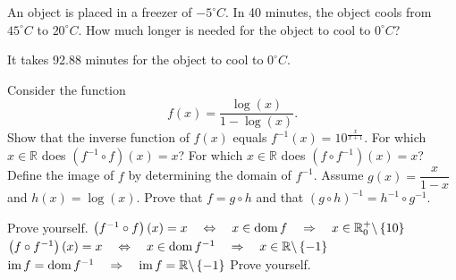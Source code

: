 \begin{Exercise}[difficulty=2] An object is placed in a freezer of $-5^{\circ} C$. In 40 minutes, the object cools from $45^{\circ} C$ to $20^{\circ} C$. How much longer is needed for the object to cool to $0^{\circ} C$?

\end{Exercise}

\begin{Answer}\phantom{}
    It takes 92.88 minutes for the object to cool to $0^{\circ} C$.
\end{Answer}

\ifanalysis
\begin{Exercise}[difficulty=1] Consider the function 
\[ f(x) = \dfrac{\log (x)}{1- \log (x)}. \]
    \Question Show that the inverse function of $f(x)$ equals $f^{-1}(x) = 10^{\frac{x}{x+1}}$.
    \Question For which  $x\in\mathbb{R}$ does $\left(f^{-1} \circ f \right) (x) = x$? For which $x\in\mathbb{R}$ does $\left(f \circ f^{-1}  \right) (x) = x$? 
    \Question Define the image of $f$ by determining the domain of $f^{-1}$.
    \Question Assume $g(x)=\dfrac{x}{1-x}$ and $h(x)=\log (x)$. Prove that $f=g \circ h$ and that $\left( g \circ h \right)^{-1} =h^{-1} \circ g^{-1}$. 

\end{Exercise}

\begin{Answer}\phantom{}
    
    \Question Prove  yourself.
     \Question $\left(f^{-1} \circ f \right) (x) = x \quad \Leftrightarrow \quad  x \in \text{dom}{\,} f \quad \Rightarrow \quad x \in \mathbb{R}^+_0 \backslash \left\{10 \right\}$ \\[0.2cm]
     $\left(f \circ f^{-1}  \right) (x) = x  \quad \Leftrightarrow \quad  x \in \text{dom}{\,} f^{-1} \quad \Rightarrow \quad x \in \mathbb{R}\backslash \left\{-1 \right\}$
    \Question $\text{im}{\,} f = \text{dom}{\,} f^{-1} \quad \Rightarrow \quad \text{im}{\,} f = \mathbb{R}\backslash \left\{-1 \right\}$
    \Question Prove  yourself.
    \EndCurrentQuestion
\end{Answer}

\fi

\ifcalculus\pagebreak\fi


\subsection*{}

